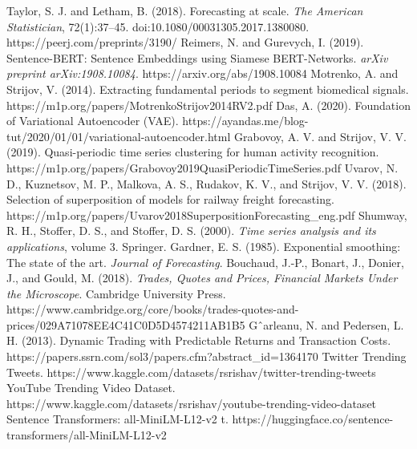   
 
Taylor, S. J. and Letham, B. (2018). Forecasting at scale. {\em The American Statistician}, 72(1):37--45. doi:10.1080/00031305.2017.1380080. https://peerj.com/preprints/3190/
Reimers, N. and Gurevych, I. (2019). Sentence-BERT: Sentence Embeddings using Siamese BERT-Networks. {\em arXiv preprint arXiv:1908.10084}. https://arxiv.org/abs/1908.10084
Motrenko, A. and Strijov, V. (2014). Extracting fundamental periods to segment biomedical signals. https://m1p.org/papers/MotrenkoStrijov2014RV2.pdf
Das, A. (2020). Foundation of Variational Autoencoder (VAE). https://ayandas.me/blog-tut/2020/01/01/variational-autoencoder.html
Grabovoy, A. V. and Strijov, V. V. (2019). Quasi-periodic time series clustering for human activity recognition. https://m1p.org/papers/Grabovoy2019QuasiPeriodicTimeSeries.pdf
Uvarov, N. D., Kuznetsov, M. P., Malkova, A. S., Rudakov, K. V., and Strijov, V. V. (2018). Selection of superposition of models for railway freight forecasting. https://m1p.org/papers/Uvarov2018SuperpositionForecasting_eng.pdf
Shumway, R. H., Stoffer, D. S., and Stoffer, D. S. (2000). {\em Time series analysis and its applications}, volume 3. Springer.
Gardner, E. S. (1985). Exponential smoothing: The state of the art. {\em Journal of Forecasting}.
Bouchaud, J.-P., Bonart, J., Donier, J., and Gould, M. (2018). {\em Trades, Quotes and Prices, Financial Markets Under the Microscope}. Cambridge University Press. https://www.cambridge.org/core/books/trades-quotes-and-prices/029A71078EE4C41C0D5D4574211AB1B5
Gˆarleanu, N. and Pedersen, L. H. (2013). Dynamic Trading with Predictable Returns and Transaction Costs. https://papers.ssrn.com/sol3/papers.cfm?abstract_id=1364170
Twitter Trending Tweets. https://www.kaggle.com/datasets/rsrishav/twitter-trending-tweets
YouTube Trending Video Dataset. https://www.kaggle.com/datasets/rsrishav/youtube-trending-video-dataset
Sentence Transformers: all-MiniLM-L12-v2 t. https://huggingface.co/sentence-transformers/all-MiniLM-L12-v2





